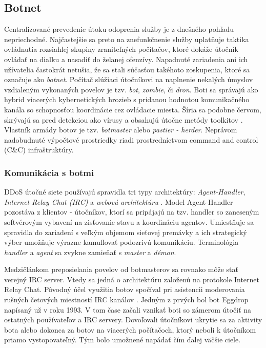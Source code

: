 \documentclass[12pt, a4paper]{article}
\begin{document}
\subsection{Botnet}
Centralizované prevedenie útoku odoprenia služby je z dnešného pohľadu nepriechodné. Najčastejšie sa preto 
na znefunkčnenie služby uplatňuje taktika ovládnutia rozsiahlej skupiny zraniteľných počítačov, ktoré dokáže 
útočník ovládať na diaľku a nasadiť do želanej ofenzívy. Napadnuté zariadenia ani ich užívatelia 
častokrát netušia, že sa stali súčasťou takéhoto zoskupenia, ktoré sa označuje ako \emph{botnet}. 
Počítač slúžiaci útočníkovi na naplnenie nekalých úmyslov vzdialeným vykonaných povelov je tzv. \emph{bot}, 
\emph{zombie}, či \emph{dron}. Boti sa správajú ako hybrid viacerých kybernetických hrozieb s pridanou 
hodnotou komunikačného  kanála so schopnosťou koordinácie cez ovládacie miesta. Šíria sa podobne červom, 
skrývajú sa pred detekciou ako vírusy a obsahujú útočne metódy toolkitov \cite{zombie-roundup}. Vlastník 
armády botov je tzv. \emph{botmaster} alebo \emph{pastier - herder}. Neprávom nadobudnuté výpočtové 
prostriedky riadi prostredníctvom command and control (C\&C) infraštruktúry.

\subsubsection{Komunikácia s botmi}
DDoS útočné siete používajú spravidla tri typy architektúry: \emph{Agent-Handler}, \emph{Internet Relay Chat 
(IRC)} a \emph{webovú architektúru} \cite{ddos-attacks} \cite{botnets}. Model Agent-Handler pozostáva z 
klientov - útočníkov, ktorí sa pripájajú na tzv. handler so zaneseným softvérovým vybavení na zisťovanie 
stavu a koordináciu agentov. Umiestňuje sa spravidla do zariadení s veľkým objemom sieťovej premávky a ich 
strategický výber umožňuje výrazne kamuflovať podozrivú komunikáciu. Terminológia \emph{handler} a 
\emph{agent} sa zvykne zamieňať s \emph{master} a \emph{démon}. 

Medzičlánkom preposielania povelov od botmasterov sa rovnako môže stať verejný IRC server. Vtedy sa jedná o 
architektúru založenú na protokole Internet Relay Chat. Pôvodný účel využitia botov spočíval pri
asistencii moderovania rušných četových miestností IRC kanálov \cite{zombie-roundup}. Jedným z prvých bol 
bot Eggdrop napísaný už v roku 1993. V tom čase začali vznikať boti so zámerom útočiť na ostatných 
používateľov a IRC servery. Dovoľovali útočníkovi ukrytie sa za aktivity bota alebo dokonca za botov na 
viacerých počítačoch, ktorý neboli k útočníkom priamo vystopovateľný. Tým bolo umožnené napádať čím ďalej 
väčšie ciele. 
\end{document}
